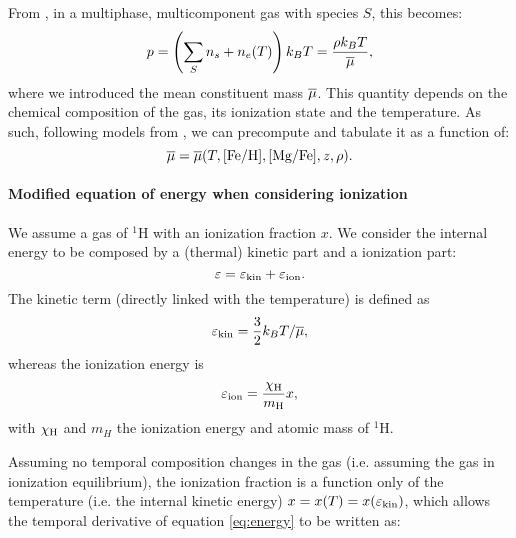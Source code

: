 From \citep[p. 161]{Vandenbroucke2016}, in a multiphase, multicomponent gas with species $S$, this becomes:
\begin{equation}
p = \left(\sum_S n_s + n_e(T)\right) k_BT =\frac{\rho k_B T}{\overline{\mu}},
\end{equation}
where we introduced the mean constituent mass $\overline{\mu}$.
This quantity depends on the chemical composition of the gas, its ionization state and the temperature.
As such, following models from \citet{DeRijcke2013}, we can precompute and tabulate it as a function of:
\[\overline{\mu} = \overline{\mu}(T, [\text{Fe}/\text{H}], [\text{Mg}/\text{Fe}], z, \rho).\]

\paragraph{Modified equation of energy when considering ionization}
We assume a gas of ${}^1$H with an ionization fraction $x$.
We consider the internal energy to be composed by a (thermal) kinetic part and a ionization part:
\begin{equation}
\label{eq:energy}
\varepsilon = \varepsilon_\text{kin} + \varepsilon_\text{ion}.
\end{equation}
The kinetic term (directly linked with the temperature) is defined as
\begin{equation}
\varepsilon_\text{kin} = \frac 3 2 k_B T/ \overline{\mu},
\end{equation}
whereas the ionization energy is
\begin{equation}
\label{eq:energy_ion}
\varepsilon_\text{ion} = \dfrac{\chi_\text H}{m_\text H} x,
\end{equation}
with $\chi_\text H$ and $m_H$ the ionization energy and atomic mass of ${}^1$H.

Assuming no temporal composition changes in the gas (i.e. assuming the gas in ionization equilibrium), the ionization fraction is a function only of the temperature (i.e. the internal kinetic energy) $x = x(T) = x(\varepsilon_\text{kin})$, which allows the temporal derivative of equation \eqref{eq:energy} to be written as:

